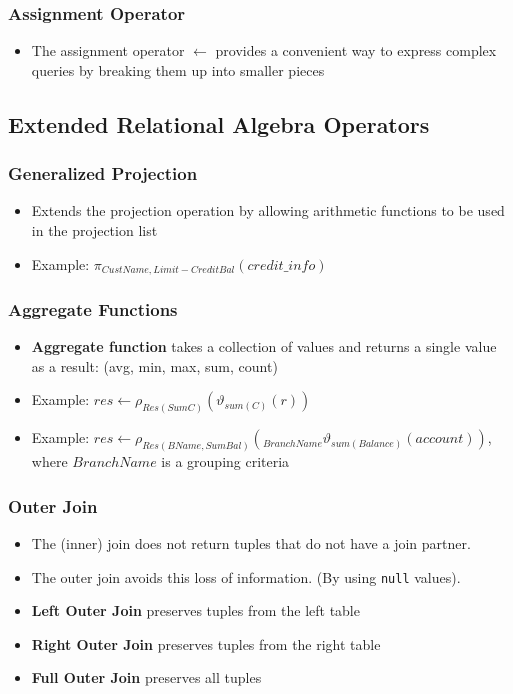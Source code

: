 \subsubsection{Assignment Operator}
\begin{itemize}[label=\(\rhd\)]
    \item The assignment operator $\leftarrow$ provides a convenient way to express complex queries by breaking them up into smaller pieces
\end{itemize}

\subsection{Extended Relational Algebra Operators}

\subsubsection{Generalized Projection}
\begin{itemize}[label=\(\rhd\)]
    \item Extends the projection operation by allowing arithmetic functions to be used in the projection list
    \item Example: $\pi_{CustName, Limit - CreditBal}(credit\_info)$
\end{itemize}
\subsubsection{Aggregate Functions}
\begin{itemize}[label=\(\rhd\)]
    \item \textbf{Aggregate function} takes a collection of values and returns a single value as a result: (avg, min, max, sum, count)
    \item Example: $res \leftarrow \rho_{Res(SumC)} ( \vartheta _{sum(C)} (r))$
    \item Example: $res \leftarrow \rho_{Res(BName,SumBal)}(_{BranchName} \vartheta_{sum(Balance)}(account))$, where $BranchName$ is a grouping criteria
\end{itemize}
\subsubsection{Outer Join}
\begin{itemize}[label=\(\rhd\)]
    \item The (inner) join does not return tuples that do not have a join partner.
    \item The outer join avoids this loss of information. (By using \texttt{null} values).
    \item \textbf{Left Outer Join} preserves tuples from the left table
    \item \textbf{Right Outer Join} preserves tuples from the right table
    \item \textbf{Full Outer Join} preserves all tuples
\end{itemize}

